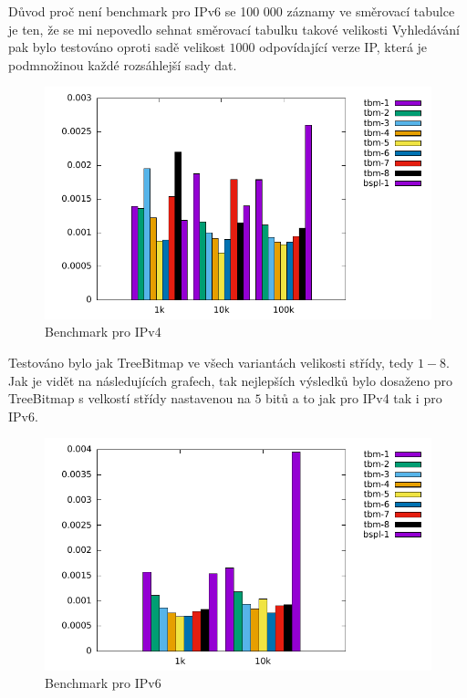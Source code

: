 Důvod proč není benchmark pro IPv6 se 100 000 záznamy ve směrovací tabulce je ten, že se mi nepovedlo
sehnat směrovací tabulku takové velikosti
Vyhledávání pak bylo testováno oproti sadě velikost $1000$ odpovídající verze IP, která je podmnožinou každé
rozsáhlejší sady dat.

\begin{figure}[!htbp]
	\centering
	\includegraphics[scale=1]{fig/lpm-ipv4.pdf}
	\caption{Benchmark pro IPv4}
    \label{fig:lpm-ipv4}
\end{figure}

Testováno bylo jak TreeBitmap ve všech variantách velikosti střídy, tedy $1-8$.
Jak je vidět na následujících grafech, tak nejlepších výsledků bylo dosaženo pro TreeBitmap s velkostí
střídy nastavenou na $5$ bitů a to jak pro IPv4 tak i pro IPv6.

\begin{figure}[!htbp]
	\centering
	\includegraphics[scale=1]{fig/lpm-ipv6.pdf}
	\caption{Benchmark pro IPv6}
    \label{fig:lpm-ipv4}
\end{figure}

